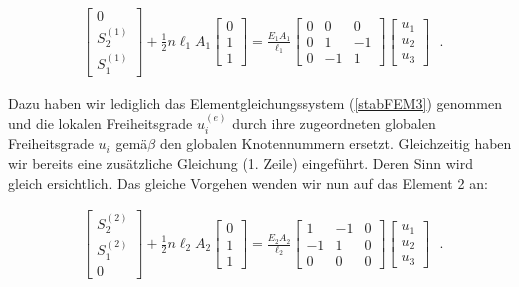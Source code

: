 \begin{equation}
\label{stabFEM5}
\begin{align}
\begin{bmatrix}
0 \\
S_2^{(1)}\\
S_1^{(1)}
\end{bmatrix} + \frac{1}{2}n\ell_1 A_1 \begin{bmatrix}
0 \\
1\\
1
\end{bmatrix} = \frac{E_1A_1}{\ell_1}\begin{bmatrix}
0 & 0 & 0\\
0 & 1 & -1\\
0 & -1 & 1
\end{bmatrix} \begin{bmatrix}
u_1 \\
u_2\\
u_3
\end{bmatrix}
\end{align} \; .
\end{equation}

Dazu haben wir lediglich das Elementgleichungssystem (\ref{stabFEM3}) genommen und die lokalen Freiheitsgrade $u_i^{(e)}$ durch ihre zugeordneten globalen Freiheitsgrade $u_i$ gemä$\beta$ den globalen Knotennummern ersetzt. Gleichzeitig haben wir bereits eine zusätzliche Gleichung (1. Zeile) eingeführt. Deren Sinn wird gleich ersichtlich. Das gleiche Vorgehen wenden wir nun auf das Element 2 an:

\begin{equation}
\label{stabFEM6}
\begin{align}
\begin{bmatrix}
S_2^{(2)} \\
S_1^{(2)} \\
0
\end{bmatrix} + \frac{1}{2}n\ell_2 A_2 \begin{bmatrix}
0 \\
1\\
1
\end{bmatrix} = \frac{E_2A_2}{\ell_2}\begin{bmatrix}
1 & -1 & 0\\
-1 & 1 & 0\\
0 & 0 & 0
\end{bmatrix} \begin{bmatrix}
u_1 \\
u_2\\
u_3
\end{bmatrix}
\end{align} \; .
\end{equation}

